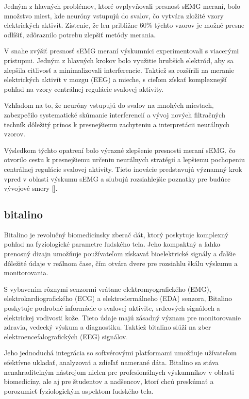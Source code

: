 \tab[5 mm] Jedným z hlavných problémov, ktoré ovplyvňovali presnosť sEMG meraní, bolo množstvo miest, kde neuróny vstupujú do svalov, čo vytvára zložité vzory elektrických aktivít. Zistenie, že len približne 60\% týchto vzorov je možné presne odlíšiť, zdôraznilo potrebu zlepšiť metódy merania.

\tab[5 mm] V snahe zvýšiť presnosť sEMG meraní výskumníci experimentovali s viacerými prístupmi. Jedným z hlavných krokov bolo využitie hrubších elektród, aby sa zlepšila citlivosť a minimalizovali interferencie. Taktiež sa rozšírili na meranie elektrických aktivít v mozgu (EEG) a mieche, s cieľom získať komplexnejší pohľad na vzory centrálnej regulácie svalovej aktivity.

\tab[5 mm] Vzhľadom na to, že neuróny vstupujú do svalov na mnohých miestach, zabezpečilo systematické skúmanie interferencií a vývoj nových filtračných techník dôležitý prínos k presnejšiemu zachyteniu a interpretácii neurálnych vzorov.

\tab[5 mm] Výsledkom týchto opatrení bolo výrazné zlepšenie presnosti meraní sEMG, čo otvorilo cestu k presnejšiemu určeniu neurálnych stratégií a lepšiemu pochopeniu centrálnej regulácie svalovej aktivity. Tieto inovácie predstavujú významný krok vpred v oblasti výskumu sEMG a sľubujú rozsiahlejšie poznatky pre budúce vývojové smery [\cite{doi:10.1152/japplphysiol.00162.2014}].
\newpage
\subsection{bitalino}
\tab[5 mm] Bitalino je revolučný biomedicínsky zberač dát, ktorý poskytuje komplexný pohľad na fyziologické parametre ľudského tela. Jeho kompaktný a ľahko prenosný dizajn umožňuje používateľom získavať bioelektrické signály a ďalšie dôležité údaje v reálnom čase, čím otvára dvere pre rozsiahlu škálu výskumu a monitorovania.

\tab[5 mm] S vybavením rôznymi senzormi vrátane elektromyografického (EMG), elektrokardiografického (ECG) a elektrodermálneho (EDA) senzora, Bitalino poskytuje podrobné informácie o svalovej aktivite, srdcových signáloch a elektrickej vodivosti kože. Tieto údaje majú zásadný význam pre monitorovanie zdravia, vedecký výskum a diagnostiku. Taktiež bitalino slúži na zber elektroencefalografických (EEG) signálov.

\tab[5 mm] Jeho jednoduchá integrácia so softvérovými platformami umožňuje užívateľom efektívne ukladať, analyzovať a zdieľať namerané dáta. Bitalino sa stáva nenahraditeľným nástrojom nielen pre profesionálnych výskumníkov v oblasti biomedicíny, ale aj pre študentov a nadšencov, ktorí chcú preskúmať a porozumieť fyziologickým aspektom ľudského tela.


